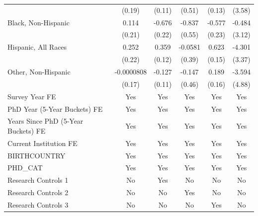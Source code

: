 \begin{table}[htbp]
\begin{tabular}{l*{5}{c}}
  &      (0.19)         &      (0.11)         &      (0.51)         &      (0.13)         &      (3.58)         \\
[1em]
Black, Non-Hispanic&       0.114         &      -0.676\sym{***}&      -0.837         &      -0.577\sym{**} &      -0.484         \\
  &      (0.21)         &      (0.22)         &      (0.55)         &      (0.23)         &      (3.12)         \\
[1em]
Hispanic, All Races&       0.252         &       0.359\sym{***}&     -0.0581         &       0.623\sym{***}&      -4.301         \\
  &      (0.22)         &      (0.12)         &      (0.39)         &      (0.15)         &      (3.37)         \\
[1em]
Other, Non-Hispanic&  -0.0000808         &      -0.127         &      -0.147         &       0.189         &      -3.594         \\
  &      (0.17)         &      (0.11)         &      (0.46)         &      (0.16)         &      (4.88)         \\
[1em]
Survey Year FE&         Yes         &         Yes         &         Yes         &         Yes         &         Yes         \\
[1em]
PhD Year (5-Year Buckets) FE&         Yes         &         Yes         &         Yes         &         Yes         &         Yes         \\
[1em]
Years Since PhD (5-Year Buckets) FE&         Yes         &         Yes         &         Yes         &         Yes         &         Yes         \\
[1em]
Current Institution FE&         Yes         &         Yes         &         Yes         &         Yes         &         Yes         \\
[1em]
BIRTHCOUNTRY&         Yes         &         Yes         &         Yes         &         Yes         &         Yes         \\
[1em]
PHD\_CAT&         Yes         &         Yes         &         Yes         &         Yes         &         Yes         \\
\hline
Research Controls 1&          No         &         Yes         &          No         &          No         &          No         \\
Research Controls 2&          No         &          No         &         Yes         &          No         &          No         \\
Research Controls 3&          No         &          No         &          No         &         Yes         &          No         \\

\end{tabular}
\end{table}
